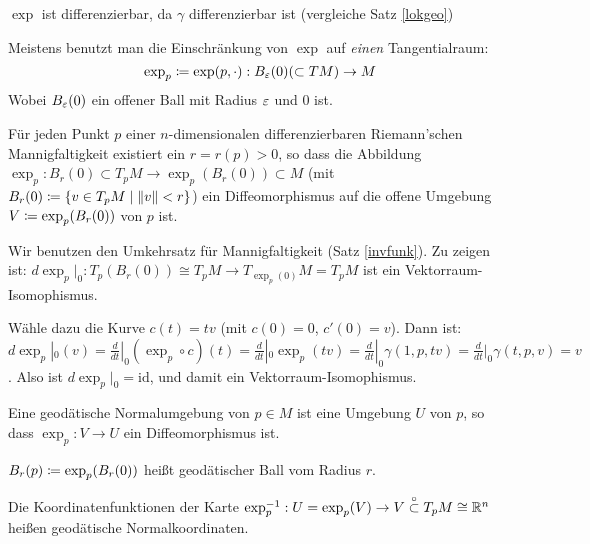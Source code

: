\documentclass[a4paper,twoside,DIV15,BCOR12mm]{scrbook}
\newcommand{\otm}{\stackrel{\circ}{\subset}} %
\begin{document}
\begin{bemerkungen}
\item $\exp$ ist differenzierbar, da $\gamma$ differenzierbar ist (vergleiche Satz \ref{lokgeo})
\item Meistens benutzt man die Einschränkung von $\exp$ auf \emph{einen} Tangentialraum:
\[
\exp_p \da \exp(p,\cdot): B_\ep(0) (\subset TM) \to M
\]
Wobei $B_\varepsilon(0)$ ein offener Ball mit Radius $\varepsilon$ und $0$ ist.
\end{bemerkungen}

\begin{satz}
Für jeden Punkt $p$ einer $n$-dimensionalen differenzierbaren Riemann’schen Mannigfaltigkeit existiert ein $r=r(p)>0$, so dass die Abbildung $\exp_p: B_r(0)\subset T_pM \to \exp_p(B_r(0)) \subset M$ (mit $B_r(0) \da \{v\in T_pM \mid \|v\|<r\}$) ein Diffeomorphismus auf die offene Umgebung $V\da \exp_p(B_r(0))$ von $p$ ist.
\end{satz}

\begin{beweis}
Wir benutzen den Umkehrsatz für Mannigfaltigkeit (Satz \ref{invfunk}). Zu zeigen ist: $d\exp_p|_0: T_p(B_r(0)) \cong T_pM \to T_{\exp_p(0)}M = T_pM$ ist ein Vektorraum-Isomophismus.

Wähle dazu die Kurve $c(t) = tv$ (mit $c(0)=0$, $c'(0)=v$). Dann ist: $d\exp_p|_0(v) = \frac d{dt}|_0 (\exp _p \circ c)(t) = \frac d{dt}|_0 \exp_p(tv) = \frac d{dt}|_0 \gamma(1,p,tv) = \frac d{dt}|_0 \gamma(t,p,v) = v$. Also ist $d\exp_p|_0 = \text{id}$, und damit ein Vektorraum-Isomophismus.
\end{beweis}

\begin{definition}
Eine geodätische Normalumgebung  von $p\in M$ ist eine Umgebung $U$ von $p$, so dass $\exp_p: V\to U$ ein Diffeomorphismus ist.

$B_r(p) \da \exp_p(B_r(0))$ heißt geodätischer Ball vom Radius $r$.

Die Koordinatenfunktionen der Karte $\exp_p^{-1} : U = \exp_p(V) \to V \otm T_pM \cong \MdR^n$ heißen geodätische Normalkoordinaten.
\end{definition}
\end{document}
